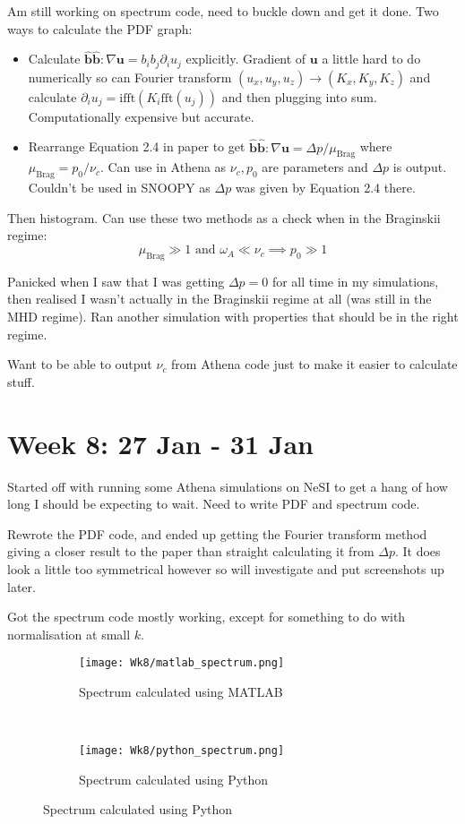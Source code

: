 \documentclass[12pt,letterpaper]{article}
\newcommand{\B}[1]{\mathbf{#1}}
\begin{document}
  Am still working on spectrum code, need to buckle down and get it done. Two ways to calculate the PDF graph:
  \begin{itemize}
    \item Calculate $\B{\hat{b}\hat{b}}:\nabla \B{u}=b_ib_j\partial_i u_j$ explicitly. Gradient of $\B{u}$ a little hard to do numerically so can Fourier transform $(u_x,u_y,u_z)\to (K_x,K_y,K_z)$ and calculate $\partial_iu_j=\text{ifft}(K_i\text{fft}(u_j))$ and then plugging into sum. Computationally expensive but accurate.

    \item Rearrange Equation 2.4 in paper to get $\B{\hat{b}\hat{b}}:\nabla \B{u}=\Delta p/\mu_{\text{Brag}}$ where $\mu_{\text{Brag}}=p_0/\nu_c$. Can use in Athena as $\nu_c, p_0$ are parameters and $\Delta p$ is output. Couldn't be used in SNOOPY as $\Delta p$ was given by Equation 2.4 there.
  \end{itemize}
  Then histogram. Can use these two methods as a check when in the Braginskii regime:
  $$
    \mu_\text{Brag}\gg 1 \text{ and } \omega_A\ll \nu_c \implies p_0\gg 1
  $$

  Panicked when I saw that I was getting $\Delta p =0$ for all time in my simulations, then realised I wasn't actually in the Braginskii regime at all (was still in the MHD regime). Ran another simulation with properties that should be in the right regime.

  Want to be able to output $\nu_c$ from Athena code just to make it easier to calculate stuff.

  \newpage
  \section*{Week 8: 27 Jan - 31 Jan}

  Started off with running some Athena simulations on NeSI to get a hang of how long I should be expecting to wait. Need to write PDF and spectrum code.

  Rewrote the PDF code, and ended up getting the Fourier transform method giving a closer result to the paper than straight calculating it from $\Delta p$. It does look a little too symmetrical however so will investigate and put screenshots up later.

  Got the spectrum code mostly working, except for something to do with normalisation at small $k$.

  \begin{figure}[!h]
   \centering
  \begin{subfigure}{.4\linewidth}
    \centering
  \texttt{[image: Wk8/matlab\_spectrum.png]}
  \caption{Spectrum calculated using MATLAB}
  \label{fig:mat_spec}
  \end{subfigure}
  \
  \begin{subfigure}{.4\linewidth}
    \centering
  \texttt{[image: Wk8/python\_spectrum.png]}
  \caption{Spectrum calculated using Python}
  \label{fig:py_spec}
  \end{subfigure}

  \label{fig:spec_rewrite}
  \end{figure}
\end{document}
